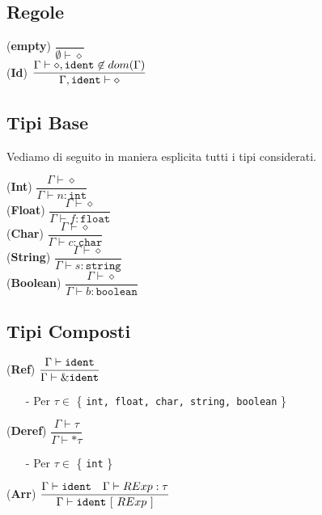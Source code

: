 \documentclass[12pt]{article}
\begin{document}
\subsection*{Regole}
\begin{center}
\noindent (\textbf{empty})
$\dfrac{}{\emptyset \vdash \diamond}$\\[0.2in]
\noindent (\textbf{Id})
$\dfrac{\Gamma \vdash \diamond , \texttt{\texttt{ident}} \not\in dom(\Gamma)}{\Gamma, \texttt{\texttt{ident}} \vdash \diamond}$\\[0.1in]
\end{center}
\subsection*{Tipi Base}
Vediamo di seguito in maniera esplicita tutti i tipi considerati.
\begin{center}
\noindent(\textbf{Int})
$\dfrac{\Gamma \vdash \diamond}{\Gamma \vdash n : \texttt{int}}$\\[0.1in]
\noindent(\textbf{Float})
$\dfrac{\Gamma \vdash \diamond}{\Gamma \vdash f : \texttt{float}}$\\[0.1in]
\noindent(\textbf{Char})
$\dfrac{\Gamma \vdash \diamond}{\Gamma \vdash c : \texttt{char}}$\\[0.1in]
\noindent(\textbf{String})
$\dfrac{\Gamma \vdash \diamond}{\Gamma \vdash s : \texttt{string}}$\\[0.1in]
\noindent(\textbf{Boolean})
$\dfrac{\Gamma \vdash \diamond}{\Gamma \vdash b : \texttt{boolean}}$\\[0.1in]
\end{center}

\subsection*{Tipi Composti}

\begin{center}
\noindent(\textbf{Ref})
$\dfrac{\Gamma \vdash \texttt{\texttt{ident}}}{\Gamma \vdash \text{\&} \texttt{\texttt{ident}}}$\\[0.1in]
\begin{itemize}
\item[-] Per $\tau \in$ \{ \texttt{int, float, char, string, boolean} \}
\end{itemize}
\noindent(\textbf{Deref})
$\dfrac{\Gamma \vdash \tau}{\Gamma \vdash \text{*} \tau}$\\[0.1in]
\begin{itemize}
\item[-] Per $\tau \in$ \{ \texttt{int} \}
\end{itemize}
\noindent(\textbf{Arr})
$\dfrac{\Gamma \vdash \texttt{\texttt{ident}}\ \ \ \Gamma \vdash RExp:\tau}{\Gamma \vdash \texttt{ident}\ [\ RExp\ ]}$\\[0.1in]
\end{center}
\end{document}
